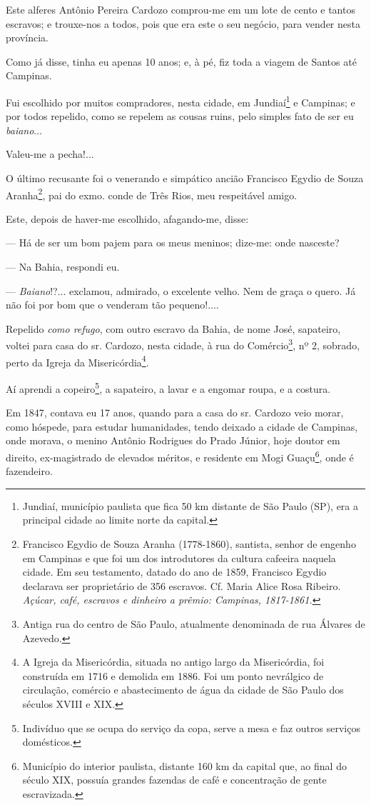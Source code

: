 Este alferes Antônio Pereira Cardozo comprou-me em um lote de cento e
tantos escravos; e trouxe-nos a todos, pois que era este o seu negócio,
para vender nesta província.

Como já disse, tinha eu apenas 10 anos; e, à pé, fiz toda a viagem de
Santos até Campinas.

Fui escolhido por muitos compradores, nesta cidade, em Jundiaí\footnote{
  Jundiaí, município paulista que fica 50 km distante de São Paulo (SP),
  era a principal cidade ao limite norte da capital.} e Campinas; e por
todos repelido, como se repelem as cousas ruins, pelo simples fato de
ser eu \emph{baiano}...

Valeu-me a pecha!...

O último recusante foi o venerando e simpático ancião Francisco Egydio
de Souza Aranha\footnote{Francisco Egydio de Souza Aranha (1778-1860),
  santista, senhor de engenho em Campinas e que foi um dos introdutores
  da cultura cafeeira naquela cidade. Em seu testamento, datado do ano
  de 1859, Francisco Egydio declarava ser proprietário de 356 escravos.
  Cf. Maria Alice Rosa Ribeiro. \emph{Açúcar, café, escravos e dinheiro
  a prêmio: Campinas, 1817-1861.}}, pai do exmo. conde de Três Rios, meu
respeitável amigo.

Este, depois de haver-me escolhido, afagando-me, disse:

--- Há de ser um bom pajem para os meus meninos; dize-me: onde
nasceste?

--- Na Bahia, respondi eu.

--- \emph{Baiano}!?... exclamou, admirado, o excelente velho. Nem de
graça o quero. Já não foi por bom que o venderam tão pequeno!....

Repelido \emph{como refugo}, com outro escravo da Bahia, de nome José,
sapateiro, voltei para casa do sr. Cardozo, nesta cidade, à rua do
Comércio\footnote{Antiga rua do centro de São Paulo, atualmente
  denominada de rua Álvares de Azevedo.}, nº 2, sobrado, perto da Igreja
da Misericórdia\footnote{A Igreja da Misericórdia, situada no antigo
  largo da Misericórdia, foi construída em 1716 e demolida em 1886. Foi
  um ponto nevrálgico de circulação, comércio e abastecimento de água da
  cidade de São Paulo dos séculos XVIII e XIX.}.

Aí aprendi a copeiro\footnote{Indivíduo que se ocupa do serviço da
  copa, serve a mesa e faz outros serviços domésticos.}, a sapateiro, a
lavar e a engomar roupa, e a costura.

Em 1847, contava eu 17 anos, quando para a casa do sr. Cardozo veio
morar, como hóspede, para estudar humanidades, tendo deixado a cidade de
Campinas, onde morava, o menino Antônio Rodrigues do Prado Júnior, hoje
doutor em direito, ex-magistrado de elevados méritos, e residente em
Mogi Guaçu\footnote{Município do interior paulista, distante 160 km da
  capital que, ao final do século XIX, possuía grandes fazendas de café
  e concentração de gente escravizada.}, onde é fazendeiro.

